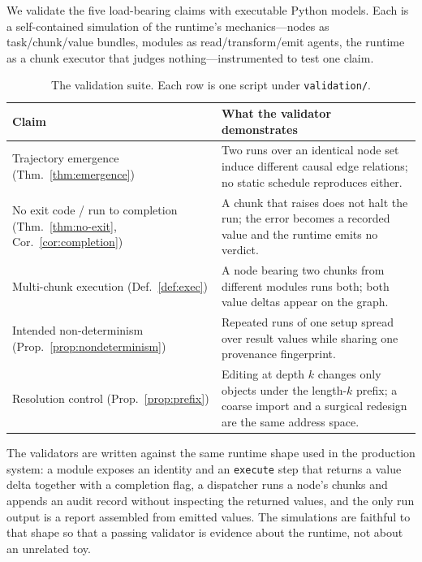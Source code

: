 \documentclass[11pt,a4paper,twocolumn]{article}
\theoremstyle{definition}
\begin{document}
We validate the five load-bearing claims with executable Python models. Each is
a self-contained simulation of the runtime's mechanics---nodes as
task/chunk/value bundles, modules as read/transform/emit agents, the runtime as
a chunk executor that judges nothing---instrumented to test one claim. 

\begin{table}[h]
  \centering
  \begin{tabular}{@{}p{}p{}@{}}
    \toprule
    \textbf{Claim} & \textbf{What the validator demonstrates} \\
    \midrule
    Trajectory emergence
    (Thm.~\ref{thm:emergence}) &
    Two runs over an identical node set induce different causal edge relations;
    no static schedule reproduces either. \\[0.4em]
    No exit code / run to completion
    (Thm.~\ref{thm:no-exit}, Cor.~\ref{cor:completion}) &
    A chunk that raises does not halt the run; the error becomes a recorded
    value and the runtime emits no verdict. \\[0.4em]
    Multi-chunk execution
    (Def.~\ref{def:exec}) &
    A node bearing two chunks from different modules runs both; both value
    deltas appear on the graph. \\[0.4em]
    Intended non-determinism
    (Prop.~\ref{prop:nondeterminism}) &
    Repeated runs of one setup spread over result values while sharing one
    provenance fingerprint. \\[0.4em]
    Resolution control
    (Prop.~\ref{prop:prefix}) &
    Editing at depth $k$ changes only objects under the length-$k$ prefix; a
    coarse import and a surgical redesign are the same address space. \\
    \bottomrule
  \end{tabular}
  \caption{The validation suite. Each row is one script under
  \texttt{validation/}.}
  \label{tab:validation}
\end{table}

The validators are written against the same runtime shape used in the production
system: a module exposes an identity and an \texttt{execute} step that returns a
value delta together with a completion flag, a dispatcher runs a node's chunks
and appends an audit record without inspecting the returned values, and the only
run output is a report assembled from emitted values. The simulations are
faithful to that shape so that a passing validator is evidence about the runtime,
not about an unrelated toy.
\end{document}
